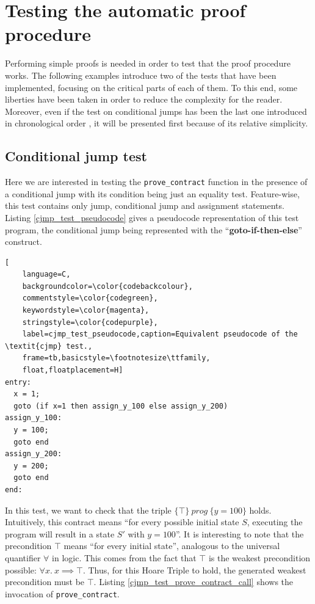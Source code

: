 \documentclass{kththesis}
\newcommand{\htriple}[3]{\ensuremath{\{#1\}~#2~\{#3\}}}
\begin{document}
{\section{Testing the automatic proof procedure}

Performing simple proofs is needed in order to test that the proof procedure works. The following examples introduce two of the tests that have been implemented, focusing on the critical parts of each of them. To this end, some liberties have been taken in order to reduce the complexity for the reader. Moreover, even if the test on conditional jumps has been the last one introduced in chronological order \footnotemark, it will be presented first because of its relative simplicity.


\subsection{Conditional jump test} \label{cjmp_test}

Here we are interested in testing the \texttt{prove\_contract} function in the presence of a conditional jump with its condition being just an equality test. Feature-wise, this test contains only jump, conditional jump and assignment statements. Listing \ref{cjmp_test_pseudocode} gives a pseudocode representation of this test program, the conditional jump being represented with the ``\textbf{goto-if-then-else}'' construct.

\begin{lstlisting}[
    language=C,
    backgroundcolor=\color{codebackcolour},
    commentstyle=\color{codegreen},
    keywordstyle=\color{magenta},
    stringstyle=\color{codepurple},
    label=cjmp_test_pseudocode,caption=Equivalent pseudocode of the \textit{cjmp} test.,
    frame=tb,basicstyle=\footnotesize\ttfamily,
    float,floatplacement=H]
entry:
  x = 1;
  goto (if x=1 then assign_y_100 else assign_y_200)
assign_y_100:
  y = 100;
  goto end
assign_y_200:
  y = 200;
  goto end
end:
\end{lstlisting}

In this test, we want to check that the triple \htriple{\top}{prog}{y = 100} holds. Intuitively, this contract means ``for every possible initial state $S$, executing the program will result in a state $S'$ with $y=100$''. It is interesting to note that the precondition $\top$ means ``for every initial state'', analogous to the universal quantifier $\forall$ in logic. This comes from the fact that $\top$ is the weakest precondition possible: $\forall x.~x \implies \top$. Thus, for this Hoare Triple to hold, the generated weakest precondition must be $\top$. Listing \ref{cjmp_test_prove_contract_call} shows the invocation of \texttt{prove\_contract}.

}
\end{document}
